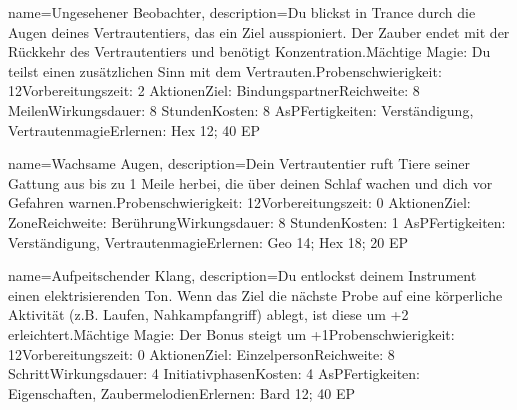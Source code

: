 {
    name={Ungesehener Beobachter},
    description={Du blickst in Trance durch die Augen deines Vertrautentiers, das ein Ziel ausspioniert. Der Zauber endet mit der Rückkehr des Vertrautentiers und benötigt Konzentration.\newline Mächtige Magie: Du teilst einen zusätzlichen Sinn mit dem Vertrauten.\newline Probenschwierigkeit: 12\newline Vorbereitungszeit: 2 Aktionen\newline Ziel: Bindungspartner\newline Reichweite: 8 Meilen\newline Wirkungsdauer: 8 Stunden\newline Kosten: 8 AsP\newline Fertigkeiten: Verständigung, Vertrautenmagie\newline Erlernen: Hex 12; 40 EP}
}


{
    name={Wachsame Augen},
    description={Dein Vertrautentier ruft Tiere seiner Gattung  aus bis zu 1 Meile herbei, die über deinen Schlaf wachen und dich vor Gefahren warnen.\newline Probenschwierigkeit: 12\newline Vorbereitungszeit: 0 Aktionen\newline Ziel: Zone\newline Reichweite: Berührung\newline Wirkungsdauer: 8 Stunden\newline Kosten: 1 AsP\newline Fertigkeiten: Verständigung, Vertrautenmagie\newline Erlernen: Geo 14; Hex 18; 20 EP}
}


{
    name={Aufpeitschender Klang},
    description={Du entlockst deinem Instrument einen elektrisierenden Ton. Wenn das Ziel die nächste Probe auf eine körperliche Aktivität (z.B. Laufen, Nahkampfangriff) ablegt, ist diese um +2 erleichtert.\newline Mächtige Magie: Der Bonus steigt um +1\newline Probenschwierigkeit: 12\newline Vorbereitungszeit: 0 Aktionen\newline Ziel: Einzelperson\newline Reichweite: 8 Schritt\newline Wirkungsdauer: 4 Initiativphasen\newline Kosten: 4 AsP\newline Fertigkeiten: Eigenschaften, Zaubermelodien\newline Erlernen: Bard 12; 40 EP}
}


